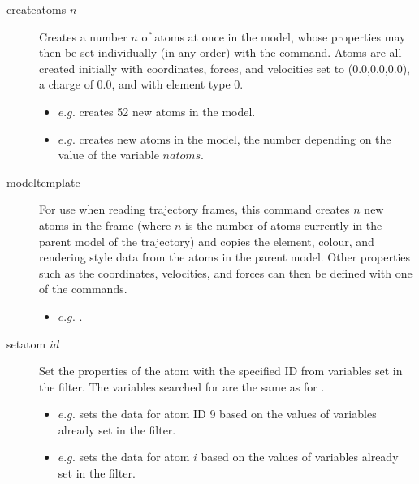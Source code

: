 \begin{description}
	\item[createatoms $n$\its]
	Creates a number $n$ of atoms at once in the model, whose properties may then be set individually (in any order) with the  command. Atoms are all created initially with coordinates, forces, and velocities set to (0.0,0.0,0.0), a charge of 0.0, and with element type 0.
	\begin{itemize}
		\item $e.g.$  creates 52 new atoms in the model.
		\item $e.g.$  creates new atoms in the model, the number depending on the value of the variable $natoms$.
	\end{itemize}

	\item[modeltemplate\its]
	For use when reading trajectory frames, this command creates $n$ new atoms in the frame (where $n$ is the number of atoms currently in the parent model of the trajectory) and copies the element, colour, and rendering style data from the atoms in the parent model. Other properties such as the coordinates, velocities, and forces can then be defined with one of the  commands.
	\begin{itemize}
		\item $e.g.$ .
	\end{itemize}

	\item[setatom $id$\its]
	Set the properties of the atom with the specified ID from variables set in the filter. The variables searched for are the same as for .
	\begin{itemize}
		\item $e.g.$  sets the data for atom ID 9 based on the values of variables already set in the filter.
		\item $e.g.$  sets the data for atom $i$ based on the values of variables already set in the filter.
	\end{itemize}


\end{description}
